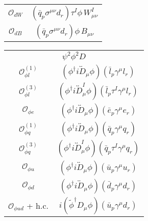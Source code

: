 \begin{table}
\begin{center}
\begin{minipage}[t]{4.6cm}
\begin{tabular}[t]{c|c}
				$\mathcal{O}_{dW}$         & $(\bar q_p \sigma^{\mu\nu} d_r) \tau^I \phi\, W_{\mu\nu}^I$ \\
				$\mathcal{O}_{dB}$        & $(\bar q_p \sigma^{\mu\nu} d_r) \phi\, B_{\mu\nu}$ 
			\end{tabular}
		\end{minipage}
		\begin{minipage}[t]{2.7cm}
			\renewcommand{\arraystretch}{1.5}
			\begin{tabular}[t]{c|c}
				\multicolumn{2}{c}{$\psi^2\phi^2 D$} \\
				\toplinetwo
				$\mathcal{O}_{\phi l}^{(1)}$      & $(\phi^\dag i\overleftrightarrow{D}_\mu \phi)(\bar l_p \gamma^\mu l_r)$\\
				$\mathcal{O}_{\phi l}^{(3)}$      & $(\phi^\dag i\overleftrightarrow{D}^I_\mu \phi)(\bar l_p \tau^I \gamma^\mu l_r)$\\
				$\mathcal{O}_{\phi e}$            & $(\phi^\dag i\overleftrightarrow{D}_\mu \phi)(\bar e_p \gamma^\mu e_r)$\\
				$\mathcal{O}_{\phi q}^{(1)}$      & $(\phi^\dag i\overleftrightarrow{D}_\mu \phi)(\bar q_p \gamma^\mu q_r)$\\
				$\mathcal{O}_{\phi q}^{(3)}$      & $(\phi^\dag i\overleftrightarrow{D}^I_\mu \phi)(\bar q_p \tau^I \gamma^\mu q_r)$\\
				$\mathcal{O}_{\phi u}$            & $(\phi^\dag i\overleftrightarrow{D}_\mu \phi)(\bar u_p \gamma^\mu u_r)$\\
				$\mathcal{O}_{\phi d}$            & $(\phi^\dag i\overleftrightarrow{D}_\mu \phi)(\bar d_p \gamma^\mu d_r)$\\
				$\mathcal{O}_{\phi u d}$ + h.c.   & $i(\widetilde \phi ^\dag D_\mu \phi)(\bar u_p \gamma^\mu d_r)$\\
			\end{tabular}
		\end{minipage}
		
		\vspace{0.25cm}
\hspace{-2.7 cm}
		

\end{center}
\end{table}
